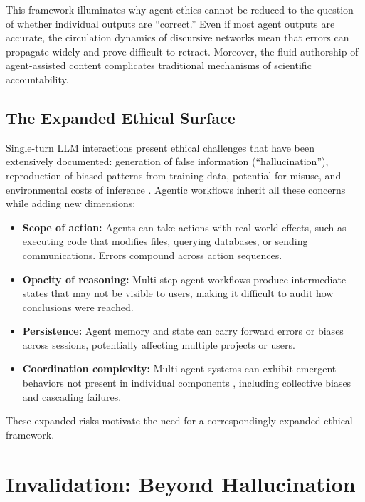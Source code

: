 \documentclass[11pt,letterpaper]{article}
\begin{document}
This framework illuminates why agent ethics cannot be reduced to the question of whether individual outputs are ``correct.'' Even if most agent outputs are accurate, the circulation dynamics of discursive networks mean that errors can propagate widely and prove difficult to retract. Moreover, the fluid authorship of agent-assisted content complicates traditional mechanisms of scientific accountability.

\subsection{The Expanded Ethical Surface}

Single-turn LLM interactions present ethical challenges that have been extensively documented: generation of false information (``hallucination''), reproduction of biased patterns from training data, potential for misuse, and environmental costs of inference \cite{bender2021,weidinger2021,bommasani2021}. Agentic workflows inherit all these concerns while adding new dimensions:

\begin{itemize}[leftmargin=*]
    \item \textbf{Scope of action:} Agents can take actions with real-world effects, such as executing code that modifies files, querying databases, or sending communications. Errors compound across action sequences.
    
    \item \textbf{Opacity of reasoning:} Multi-step agent workflows produce intermediate states that may not be visible to users, making it difficult to audit how conclusions were reached.
    
    \item \textbf{Persistence:} Agent memory and state can carry forward errors or biases across sessions, potentially affecting multiple projects or users.
    
    \item \textbf{Coordination complexity:} Multi-agent systems can exhibit emergent behaviors not present in individual components \cite{park2023}, including collective biases and cascading failures.
\end{itemize}

These expanded risks motivate the need for a correspondingly expanded ethical framework.

\section{Invalidation: Beyond Hallucination}
\label{sec:invalidation}
\end{document}
